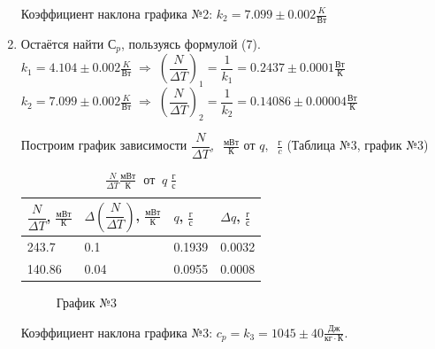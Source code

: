 \documentclass[a4paper,12pt]{article}
\begin{document}
\begin{enumerate}
		Коэффициент наклона графика №2: $k_2 = 7.099\pm0.002 \frac{K}{Вт}$

		\item Остаётся найти $С_p$, пользуясь формулой (7).
		\\ $k_1 = 4.104\pm0.002 \frac{K}{Вт} \; \Rightarrow \; \left(\dfrac{N}{\Delta T}\right)_1 = \dfrac{1}{k_1} = 0.2437 \pm 0.0001 \frac{Вт}{К}$
		\\ $k_2 = 7.099\pm0.002 \frac{K}{Вт} \; \Rightarrow \; \left(\dfrac{N}{\Delta T}\right)_2 = \dfrac{1}{k_2} = 0.14086 \pm 0.00004 \frac{Вт}{К}$

		Построим график зависимости $\dfrac{N}{\Delta T},\;\; \frac{мВт}{К}$  от  $q,\;\; \frac{г}{c}$ (Таблица №3, график №3)

		\begin{table}[h!]
			\caption{$\frac{N}{\Delta T} \frac{мВт}{К} \;\;{от}\;\; q \; \frac{г}{с}$}
			\begin{center}
				\begin{tabular}{|*{4}{l|}}
					\hline
					$\dfrac{N}{\Delta T}$, $\frac{мВт}{К}$ & $\Delta \left(\dfrac{N}{\Delta T}\right)$, $\frac{мВт}{К}$ & $q$, $\frac{г}{с}$ & $\Delta q$, $\frac{г}{с}$ \\ \hline
					243.7 & 0.1 & 0.1939 & 0.0032 \\ \hline
					140.86 & 0.04 & 0.0955 & 0.0008 \\ \hline
				\end{tabular}
			\end{center}
		\end{table}
		\begin{figure}[h!]
							\caption[]{\label{fig:5} График №3}
		\end{figure}

		Коэффициент наклона графика №3: $c_p = k_3 = 1045 \pm 40 \frac{Дж}{кг\cdot К}$.
	\end{enumerate}
\end{document}
